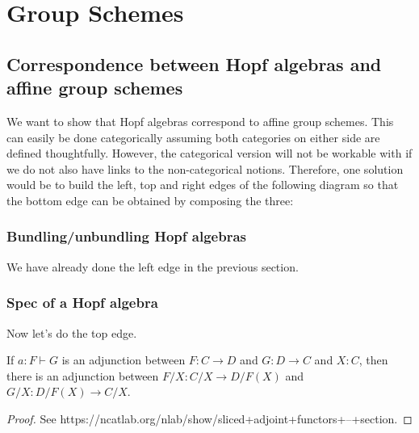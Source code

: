 \section{Group Schemes}


\subsection{Correspondence between Hopf algebras and affine group schemes}


We want to show that Hopf algebras correspond to affine group schemes.
This can easily be done categorically assuming both categories on either side are defined thoughtfully.
However, the categorical version will not be workable with if we do not also have links to the non-categorical notions.
Therefore, one solution would be to build the left, top and right edges of the following
diagram so that the bottom edge can be obtained by composing the three:


\subsubsection{Bundling/unbundling Hopf algebras}


We have already done the left edge in the previous section.


\subsubsection{Spec of a Hopf algebra}


Now let's do the top edge.


\begin{proposition}
  \label{0-slice-adj}
  \uses{}
  \leanok
  \mathlibok

  If $a : F \vdash G$ is an adjunction between $F : C \to D$ and $G : D \to C$ and $X : C$, then there is an adjunction between $F / X : C / X \to D / F(X)$ and $G / X : D / F(X) \to C / X$.
\end{proposition}
\begin{proof}
  \uses{}
  \leanok

  See https://ncatlab.org/nlab/show/sliced+adjoint+functors+--+section.
\end{proof}


